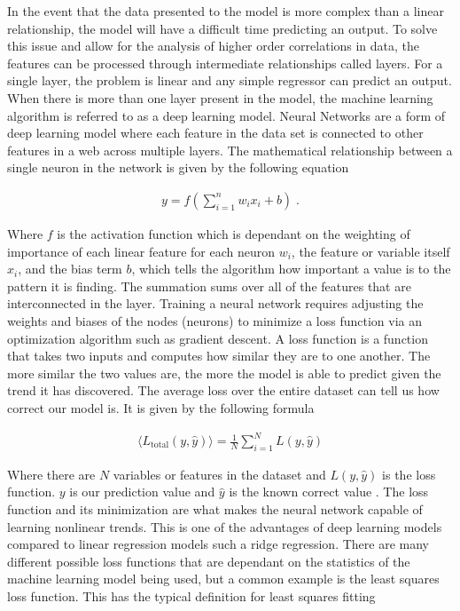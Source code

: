 \documentclass[14pt]{extreport}
\begin{document}
        In the event that the data presented to the model is more complex than a linear relationship, the model will have a difficult time predicting an output. To solve this issue and allow for the analysis of higher order correlations in data, the features can be processed through intermediate relationships called layers. For a single layer, the problem is linear and any simple regressor can predict an output. When there is more than one layer present in the model, the machine learning algorithm is referred to as a deep learning model. Neural Networks are a form of deep learning model where each feature in the data set is connected to other features in a web across multiple layers. The mathematical relationship between a single neuron in the network is given by the following equation \cite{Gazit_2024}
        
        \begin{align}
           y = f\left(\sum_{i = 1}^n w_i x_i + b \right) \;.
        \end{align}

        Where $f$ is the activation function which is dependant on the weighting of importance of each linear feature for each neuron $w_i$, the feature or variable itself $x_i$, and the bias term $b$, which tells the algorithm how important a value is to the pattern it is finding. The summation sums over all of the features that are interconnected in the layer. Training a neural network requires adjusting the weights and biases of the nodes (neurons) to minimize a loss function via an optimization algorithm such as gradient descent. A loss function is a function that takes two inputs and computes how similar they are to one another. The more similar the two values are, the more the model is able to predict given the trend it has discovered. The average loss over the entire dataset can tell us how correct our model is. It is given by the following formula
        
        \begin{align}
            \langle L_{\text{total}}(y, \hat{y}) \rangle = \frac{1}{N} \sum_{i = 1}^N L(y, \hat{y})
        \end{align}

        Where there are $N$ variables or features in the dataset and $L(y, \hat{y})$ is the loss function. $y$ is our prediction value and $\hat{y}$ is the known correct value \cite{Hoyle_2024}. The loss function and its minimization are what makes the neural network capable of learning nonlinear trends. This is one of the advantages of deep learning models compared to linear regression models such a ridge regression. There are many different possible loss functions that are dependant on the statistics of the machine learning model being used, but a common example is the least squares loss function. This has the typical definition for least squares fitting \cite{Hoyle_2024}
        
\end{document}
